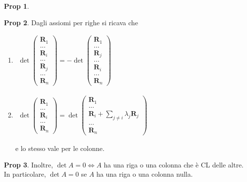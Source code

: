 \documentclass[]{article}
\theoremstyle{definition}
\theoremstyle{definition}
\newtheorem{prop}{Prop}[subsection]
\theoremstyle{definition}
\begin{document}
\begin{prop}
\end{prop} \begin{prop} Dagli assiomi per righe si ricava che 
\begin{enumerate}
\item
$
\begin{aligned}
\det
\begin{pmatrix}
	\mathbf{R}_1 	\\
	...				\\
	\mathbf{R}_i 	\\
	...				\\
	\mathbf{R}_j 	\\
	...				\\
	\mathbf{R}_n	
\end{pmatrix}
=
- \det
\begin{pmatrix}
	\mathbf{R}_1 	\\
	...				\\
	\mathbf{R}_j 	\\
	...				\\
	\mathbf{R}_i 	\\
	...				\\
	\mathbf{R}_n	
\end{pmatrix}
\end{aligned}
$
\item
$
\begin{aligned}
\det
\begin{pmatrix}
	\mathbf{R}_1 	\\
	...				\\
	\mathbf{R}_i 	\\
	...				\\
	\mathbf{R}_n	
\end{pmatrix}
=
\det
\begin{pmatrix}
	\mathbf{R}_1 	\\
	...				\\
	\mathbf{R}_i + \sum_{j \neq i} \lambda_j \mathbf{R}_j 	\\
	...				\\
	\mathbf{R}_n	
\end{pmatrix}
\end{aligned}
$
 
e lo stesso vale per le colonne.
\end{enumerate}

\end{prop} \begin{prop} Inoltre, $\det A=0 \Leftrightarrow A$ ha una riga o una colonna che è CL delle altre. In particolare, $\det A = 0$ se $A$ ha una riga o una colonna nulla.


\end{prop}
\end{document}
